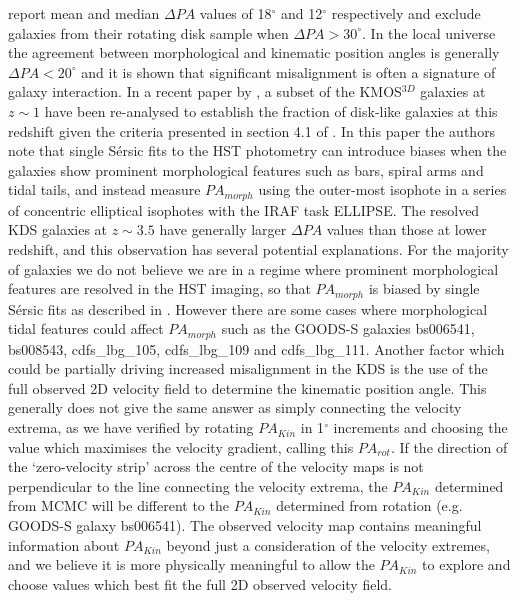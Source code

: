 \documentclass[fleqn,usenatbib]{mn2e}
\newcommand{\Sers}{S\'{e}rsic }
\begin{document}
\cite{Wisnioski2015} report mean and median $\Delta PA$ values of 18$^{\circ}$ and 12$^{\circ}$ respectively and exclude galaxies from their rotating disk sample when $\Delta PA > 30^{\circ}$.
In the local universe the agreement between morphological and kinematic position angles is generally $\Delta PA < 20^{\circ}$ \citep[e.g.][]{Epinat2008,Barrera-Ballesteros2014,Barrera-Ballesteros2015} and it is shown that significant misalignment is often a signature of galaxy interaction.
In a recent paper by \cite{Rodrigues2016}, a subset of the KMOS$^{3D}$ galaxies at $z \sim 1$ have been re-analysed to establish the fraction of disk-like galaxies at this redshift given the criteria presented in section 4.1 of \cite{Wisnioski2015}.
In this paper the authors note that single \Sers fits to the HST photometry can introduce biases when the galaxies show prominent morphological features such as bars, spiral arms and tidal tails, and instead measure $PA_{morph}$ using the outer-most isophote in a series of concentric elliptical isophotes with the IRAF task ELLIPSE.
The resolved KDS galaxies at $z \sim 3.5$ have generally larger $\Delta PA$ values than those at lower redshift, and this observation has several potential explanations.
For the majority of galaxies we do not believe we are in a regime where prominent morphological features are resolved in the HST imaging, so that $PA_{morph}$ is biased by single \Sers fits as described in \cite{Rodrigues2016}.
However there are some cases where morphological tidal features could affect $PA_{morph}$ such as the GOODS-S galaxies bs006541, bs008543, cdfs\_lbg\_105, cdfs\_lbg\_109 and cdfs\_lbg\_111.
Another factor which could be partially driving increased misalignment in the KDS is the use of the full observed 2D velocity field to determine the kinematic position angle.
This generally does not give the same answer as simply connecting the velocity extrema, as we have verified by rotating $PA_{Kin}$ in 1$^{\circ}$ increments and choosing the value which maximises the velocity gradient, calling this $PA_{rot}$.
If the direction of the `zero-velocity strip' across the centre of the velocity maps is not perpendicular to the line connecting the velocity extrema, the $PA_{Kin}$ determined from MCMC will be different to the $PA_{Kin}$ determined from rotation (e.g. GOODS-S galaxy bs006541).
The observed velocity map contains meaningful information about $PA_{Kin}$ beyond just a consideration of the velocity extremes, and we believe it is more physically meaningful to allow the $PA_{Kin}$ to explore and choose values which best fit the full 2D observed velocity field.
\end{document}
